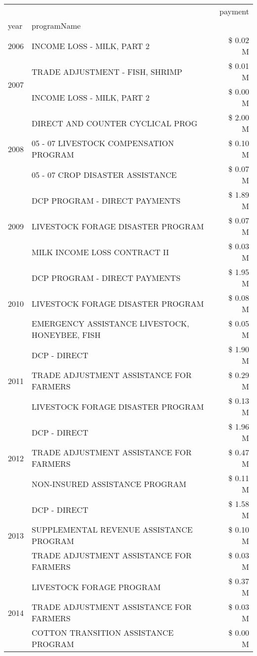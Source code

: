 \begin{tabular}{llr}
\toprule
 &  & payment \\
year & programName &  \\
\midrule
2006 & INCOME LOSS - MILK, PART 2 & \$ 0.02 M \\
\cline{1-3}
\multirow[t]{2}{*}{2007} & TRADE ADJUSTMENT - FISH, SHRIMP & \$ 0.01 M \\
 & INCOME LOSS - MILK, PART 2 & \$ 0.00 M \\
\cline{1-3}
\multirow[t]{3}{*}{2008} & DIRECT AND COUNTER CYCLICAL PROG & \$ 2.00 M \\
 & 05 - 07 LIVESTOCK COMPENSATION PROGRAM & \$ 0.10 M \\
 & 05 - 07 CROP DISASTER ASSISTANCE & \$ 0.07 M \\
\cline{1-3}
\multirow[t]{3}{*}{2009} & DCP PROGRAM - DIRECT PAYMENTS & \$ 1.89 M \\
 & LIVESTOCK FORAGE DISASTER  PROGRAM & \$ 0.07 M \\
 & MILK INCOME LOSS CONTRACT II & \$ 0.03 M \\
\cline{1-3}
\multirow[t]{3}{*}{2010} & DCP PROGRAM - DIRECT PAYMENTS & \$ 1.95 M \\
 & LIVESTOCK FORAGE DISASTER  PROGRAM & \$ 0.08 M \\
 & EMERGENCY ASSISTANCE LIVESTOCK, HONEYBEE, FISH & \$ 0.05 M \\
\cline{1-3}
\multirow[t]{3}{*}{2011} & DCP - DIRECT & \$ 1.90 M \\
 & TRADE ADJUSTMENT ASSISTANCE FOR FARMERS & \$ 0.29 M \\
 & LIVESTOCK FORAGE DISASTER PROGRAM & \$ 0.13 M \\
\cline{1-3}
\multirow[t]{3}{*}{2012} & DCP - DIRECT & \$ 1.96 M \\
 & TRADE ADJUSTMENT ASSISTANCE FOR FARMERS & \$ 0.47 M \\
 & NON-INSURED ASSISTANCE PROGRAM & \$ 0.11 M \\
\cline{1-3}
\multirow[t]{3}{*}{2013} & DCP - DIRECT & \$ 1.58 M \\
 & SUPPLEMENTAL REVENUE ASSISTANCE PROGRAM & \$ 0.10 M \\
 & TRADE ADJUSTMENT ASSISTANCE FOR FARMERS & \$ 0.03 M \\
\cline{1-3}
\multirow[t]{3}{*}{2014} & LIVESTOCK FORAGE PROGRAM & \$ 0.37 M \\
 & TRADE ADJUSTMENT ASSISTANCE FOR FARMERS & \$ 0.03 M \\
 & COTTON TRANSITION ASSISTANCE PROGRAM & \$ 0.00 M \\

\end{tabular}
